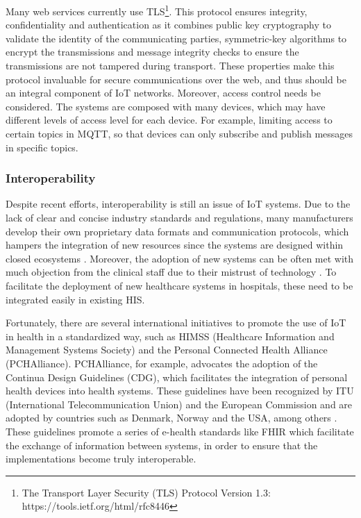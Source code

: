 Many web services currently use \acf{TLS}\footnote{The Transport Layer Security (TLS) Protocol Version 1.3: https://tools.ietf.org/html/rfc8446}. This protocol ensures integrity, confidentiality and authentication as it combines public key cryptography to validate the identity of the communicating parties, symmetric-key algorithms to encrypt the transmissions and message integrity checks to ensure the transmissions are not tampered during transport. These properties make this protocol invaluable for secure communications over the web, and thus should be an integral component of \acs{IoT} networks. Moreover, access control needs be considered. The systems are composed with many devices, which may have different levels of access level for each device. For example, limiting access to certain topics in \acs{MQTT}, so that devices can only subscribe and publish messages in specific topics.        
 
\subsubsection{Interoperability} 

Despite recent efforts, interoperability is still an issue of \acs{IoT} systems. Due to the lack of clear and concise industry standards and regulations, many manufacturers develop their own proprietary data formats and communication protocols, which hampers the integration of new resources since the systems are designed within closed ecosystems \cite{Rubi2019}. Moreover, the adoption of new systems can be often met with much objection from the clinical staff due to their mistrust of technology \cite{DursunErgezen2020}. 
To facilitate the deployment of new healthcare systems in hospitals, these need to be integrated easily in existing \acs{HIS}. \bigskip

Fortunately, there are several international initiatives to promote the use of \acs{IoT} in health in a standardized way, such as HIMSS (Healthcare Information and Management Systems Society) and the Personal Connected Health Alliance (PCHAlliance). PCHAlliance, for example, advocates the adoption of the Continua Design Guidelines (CDG), which facilitates the integration of personal health devices into health systems. These guidelines have been recognized by ITU (International Telecommunication Union) and the European Commission and are adopted by countries such as Denmark, Norway and the USA, among others \cite{PersonalConnectedHealthAlliance2017}. These guidelines promote a series of e-health standards like \acs{FHIR} which facilitate the exchange of information between systems, in order to ensure that the implementations become truly interoperable.


